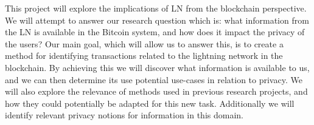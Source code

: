 This project will explore the implications of LN from the blockchain perspective.
We will attempt to answer our research question which is: what information from the LN is available in the Bitcoin system, and how does it impact the privacy of the users?
Our main goal, which will allow us to answer this, is to create a method for identifying transactions related to the lightning network in the blockchain. By achieving this we will discover what information is available to us, and we can then determine its use potential use-cases in relation to privacy. 
We will also explore the relevance of methods used in previous research projects, and how they could potentially be adapted for this new task. Additionally we will identify relevant privacy notions for information in this domain.

